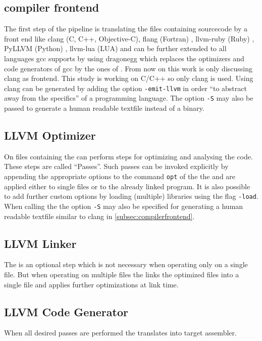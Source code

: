 \subsection{compiler frontend}\label{subsec:compilerfrontend}
The first step of the pipeline is translating the files containing sourcecode by a front end like clang (C, C++, Objective-C), flang (Fortran) \cite{fortranllvm}, llvm-ruby (Ruby) \cite{rubyllvm}, PyLLVM (Python) \cite{pyllvm}, llvm-lua (LUA) \cite{luallvm} and can be further extended to all languages gcc supports by using dragonegg \cite{dragonegg} which replaces the optimizers and code generators of gcc by the ones of \llvm.
From now on this work is only discussing clang as frontend.
This study is working on C/C++ so only clang is used.
Using clang \llvmir can be generated by adding the option \texttt{-emit-llvm} in order \enquote{to abstract away from the specifics} \cite{FastScopDetection} of a programming language.
The option \texttt{-S} may also be passed to generate a human readable textfile instead of a \llvmir binary.
\subsection{LLVM Optimizer}\label{subsec:optimizer}
On files containing \llvmir the \opt can perform steps for optimizing and analysing the code.
These steps are called \enquote{Passes}.
Such passes can be invoked explicitly by appending the appropriate options to the command \texttt{opt} of the the \opt and are applied either to single files or to the already linked program.
It is also possible to add further custom options by loading (multiple) libraries using the flag \texttt{-load}.
When calling the \opt the option \texttt{-S} may also be specified for generating a human readable textfile similar to clang in \autoref{subsec:compilerfrontend}.
\subsection{LLVM Linker}
The \linker is an optional step which is not necessary when operating only on a single \llvmir file.
But when operating on multiple files the \linker links the optimized \llvmir files into a single \llvmir file and applies further optimizations at link time.
\subsection{LLVM Code Generator}
When all desired passes are performed the \generator translates \llvmir into target assembler.
